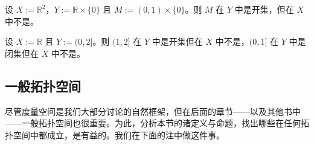 \begin{example}

\begin{items}
\item

设 $ X := \mathbb{R}^2 $，$ Y := \mathbb{R} \times \{0\} $ 且 $ M := (0, 1) \times \{0\} $。则 $ M $ 在 $ Y $ 中是开集，但在 $ X $ 中不是。

\item

设 $X := \mathbb{R}$ 且 $Y := (0, 2]$。则 $(1, 2]$ 在 $Y$ 中是开集但在 $X$ 中不是，$(0, 1]$ 在 $Y$ 中是闭集但在 $X$ 中不是。

\end{items}

\end{example}

\subsection*{一般拓扑空间}

尽管度量空间是我们大部分讨论的自然框架，但在后面的章节——以及其他书中——一般拓扑空间也很重要。为此，分析本节的诸定义与命题，找出哪些在任何拓扑空间中都成立，是有益的。我们在下面的注中做这件事。

